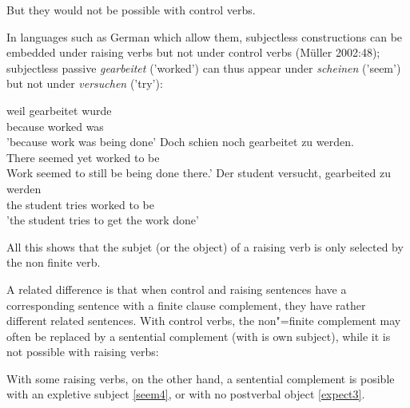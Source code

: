 \documentclass[output=paper
                ,modfonts
                ,nonflat
	        ,collection
	        ,collectionchapter
	        ,collectiontoclongg
 	        ,biblatex
                ,babelshorthands
                ,newtxmath
                ,draftmode
                ,colorlinks, citecolor=brown
]{./langsci/langscibook}
\begin{document}
But they would not be possible with control verbs.
\eal
{}
\zl

In languages such as German which allow them, subjectless constructions can be embedded under raising verbs but not under control verbs (Müller 2002:48); subjectless passive \emph{gearbeitet} ('worked') can thus appear under \emph{scheinen} ('seem') but not under \emph{versuchen} ('try'):

\begin{exe}
	\ex \label{german1}
	\begin{xlist}
	\ex weil gearbeitet wurde\\
because worked was\\
'because work was being done'
\ex Doch schien noch gearbeitet zu werden.\\
There seemed yet worked to be\\
Work seemed to still be being done there.’
\ex *Der student versucht, gearbeited zu werden\\
the student tries worked to be\\
'the student tries to get the work done'
\end{xlist}
 \end{exe}
 
 All this shows that the subjet (or the object) of a raising verb is only selected by the non
 finite verb. 

A related difference is that when control and raising sentences have a corresponding sentence with a finite clause complement, they have rather different related sentences.
With control verbs, the non"=finite complement may often be replaced by a sentential complement (with is own subject), while it is not possible with raising verbs:

\eal
{}
\zl

\eal
{}
\zl

With some raising verbs, on the other hand, a sentential complement is posible with an expletive subject \ref{seem4}, or with no postverbal object \ref{expect3}.
\end{document}
